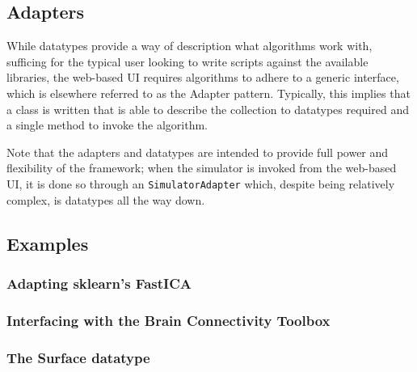 \subsection{Adapters}

While datatypes provide a way of description what algorithms work with, 
sufficing for the typical user looking to write scripts against the
available libraries, the web-based UI requires algorithms to adhere to 
a generic interface, which is elsewhere referred to as the Adapter pattern.
Typically, this implies that a class is written that is able to describe
the collection to datatypes required and a single method to invoke the
algorithm.


Note that the adapters and datatypes are intended to provide full 
power and flexibility of the framework; when the simulator is invoked from
the web-based UI, it is done so through an \texttt{SimulatorAdapter} which,
despite being relatively complex, is datatypes all the way down.

\subsection{Examples}


\subsubsection{Adapting sklearn's FastICA}

\subsubsection{Interfacing with the Brain Connectivity Toolbox}

\subsubsection{The Surface datatype}



